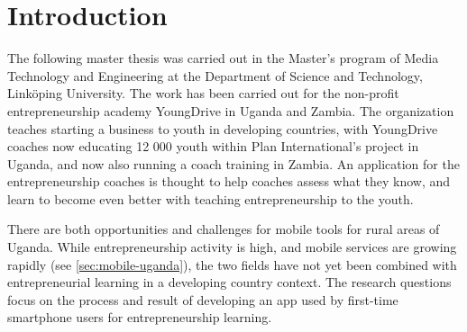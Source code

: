 \chapter{Introduction}\label{cha:intro}



The following master thesis was carried out in the Master's program of Media Technology and Engineering at the Department of Science and Technology, Linköping University. The work has been carried out for the non-profit entrepreneurship academy YoungDrive in Uganda and Zambia. The organization teaches starting a business to youth in developing countries, with YoungDrive coaches now educating 12 000 youth within Plan International's project in Uganda, and now also running a coach training in Zambia. An application for the entrepreneurship coaches is thought to help coaches assess what they know, and learn to become even better with teaching entrepreneurship to the youth.

There are both opportunities and challenges for mobile tools for rural areas of Uganda. While entrepreneurship activity is high, and mobile services are growing rapidly (see \ref{sec:mobile-uganda}), the two fields have not yet been combined with entrepreneurial learning in a developing country context. The research questions focus on the process and result of developing an app used by first-time smartphone users for entrepreneurship learning. %



% 

%





%

%

%

